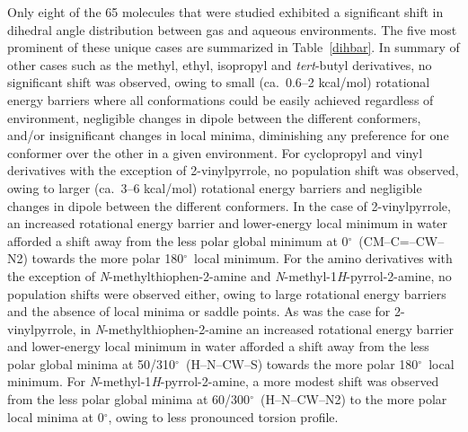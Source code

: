 \documentclass[12pt]{report}
\def\deg{$^{\circ}$}
\def\tablab{Table}\def\tabslab{\tablab s}
\newcommand*\tbl[1]{\tablab~\ref{#1}}
\begin{document}
Only eight of the 65 molecules that were studied exhibited a significant shift in dihedral angle distribution between gas and aqueous environments. The five most prominent of these unique cases are summarized in \tbl{dihbar}. In summary of other cases such as the methyl, ethyl, isopropyl and \textit{tert}-butyl derivatives, no significant shift was observed, owing to small (ca.\ 0.6--2 kcal/mol) rotational energy barriers where all conformations could be easily achieved regardless of environment, negligible changes in dipole between the different conformers, and/or insignificant changes in local minima, diminishing any preference for one conformer over the other in a given environment. For cyclopropyl and vinyl derivatives with the exception of 2-vinylpyrrole, no population shift was observed, owing to larger (ca.\ 3--6 kcal/mol) rotational energy barriers and negligible changes in dipole between the different conformers. In the case of 2-vinylpyrrole, an increased rotational energy barrier and lower-energy local minimum in water afforded a shift away from the less polar global minimum at 0\deg\ (CM--C=--CW--N2) towards the more polar 180\deg\ local minimum. For the amino derivatives with the exception of \textit{N}-methylthiophen-2-amine and \textit{N}-methyl-1\textit{H}-pyrrol-2-amine, no population shifts were observed either, owing to large rotational energy barriers and the absence of local minima or saddle points. As was the case for 2-vinylpyrrole, in \textit{N}-methylthiophen-2-amine an increased rotational energy barrier and lower-energy local minimum in water afforded a shift away from the less polar global minima at 50/310\deg\ (H--N--CW--S) towards the more polar 180\deg\ local minimum. For \textit{N}-methyl-1\textit{H}-pyrrol-2-amine, a more modest shift was observed from the less polar global minima at 60/300\deg\ (H--N--CW--N2) to the more polar local minima at 0\deg, owing to less pronounced torsion profile.
\end{document}
